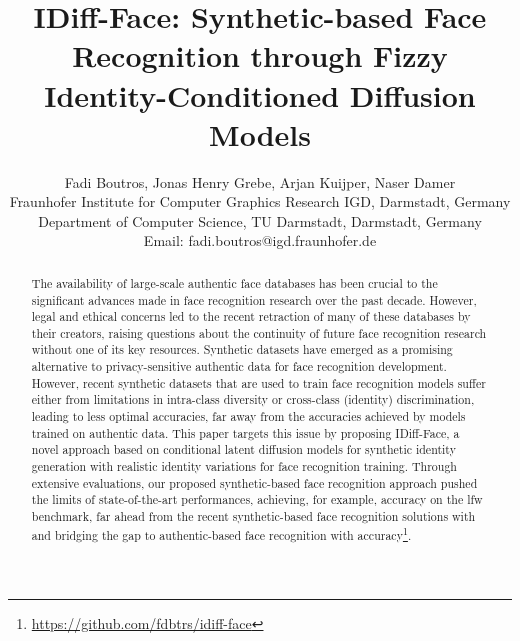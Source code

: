 \documentclass[10pt,twocolumn,letterpaper]{article}
\begin{document}
\title{IDiff-Face: Synthetic-based Face Recognition through Fizzy Identity-Conditioned Diffusion Models}

\author{Fadi Boutros, Jonas Henry Grebe,  Arjan Kuijper, Naser Damer\\
Fraunhofer Institute for Computer Graphics Research IGD, Darmstadt, Germany\\
Department of Computer Science, TU Darmstadt,
Darmstadt, Germany\\
Email: fadi.boutros@igd.fraunhofer.de
}

\maketitle
\ificcvfinal\thispagestyle{empty}\fi


\begin{abstract}
The availability of large-scale authentic face databases has been crucial to the significant advances made in face recognition research over the past decade. However, legal and ethical concerns led to the recent retraction of many of these databases by their creators, raising questions about the continuity of future face recognition research without one of its key resources. Synthetic datasets have emerged as a promising alternative to privacy-sensitive authentic data for face recognition development. However, recent synthetic datasets that are used to train face recognition models suffer either from limitations in intra-class diversity or cross-class (identity) discrimination, leading to less optimal accuracies, far away from the accuracies achieved by models trained on authentic data. This paper targets this issue by proposing IDiff-Face, a novel approach based on conditional latent diffusion models for synthetic identity generation with realistic identity variations for face recognition training. Through extensive evaluations, our proposed synthetic-based face recognition approach pushed the limits of state-of-the-art performances, achieving, for example,  accuracy on the \acrfull{lfw} benchmark, far ahead from the recent synthetic-based face recognition solutions with  and bridging the gap to authentic-based face recognition with  accuracy\footnote[1]{\url{https://github.com/fdbtrs/idiff-face}}. 
\end{abstract}





\vspace{-5mm}
\end{document}
